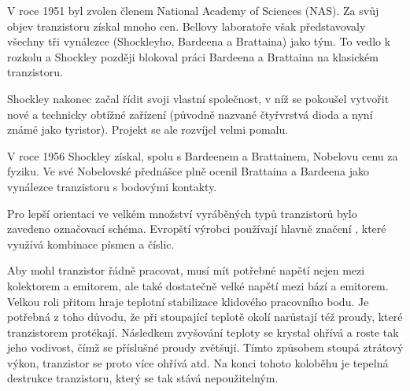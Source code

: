 \begin{tcnote}
      {\centering
        \captionsetup{type=figure}
      \par}

      V roce 1951 byl zvolen členem National Academy of Sciences (NAS). Za svůj objev tranzistoru
      získal mnoho cen. Bellovy laboratoře však představovaly všechny tři vynálezce (Shockleyho,
      Bardeena a Brattaina) jako tým. To vedlo k rozkolu a Shockley později blokoval práci Bardeena
      a Brattaina na klasickém tranzistoru.

      Shockley nakonec začal řídit svoji vlastní společnost, v níž se pokoušel vytvořit nové a
      technicky obtížné zařízení (původně nazvané čtyřvrstvá dioda a nyní známé jako tyristor).
      Projekt se ale rozvíjel velmi pomalu. 

      V roce 1956 Shockley získal, spolu s Bardeenem a Brattainem, Nobelovu cenu za fyziku. Ve své
      Nobelovské přednášce plně ocenil Brattaina a Bardeena jako vynálezce tranzistoru s bodovými
      kontakty.
    \end{tcnote}
    
    Pro lepší orientaci ve velkém množství vyráběných typů tranzistorů bylo zavedeno označovací
    schéma. Evropští výrobci používají hlavně značení ,
    které využívá kombinace písmen a číslic.


    Aby mohl tranzistor řádně pracovat, musí mít potřebné napětí nejen mezi kolektorem a emitorem,
    ale také dostatečně velké napětí mezi bází a emitorem. Velkou roli přitom hraje teplotní
    stabilizace klidového pracovního bodu. Je potřebná z toho důvodu, že při stoupající teplotě
    okolí narůstají též proudy, které tranzistorem protékají. Následkem zvyšování teploty se krystal
    ohřívá a roste tak jeho vodivost, čímž se příslušné proudy zvětšují. Tímto způsobem stoupá
    ztrátový výkon, tranzistor se proto více ohřívá atd. Na konci tohoto koloběhu je tepelná
    destrukce tranzistoru, který se tak stává nepoužitelným.

